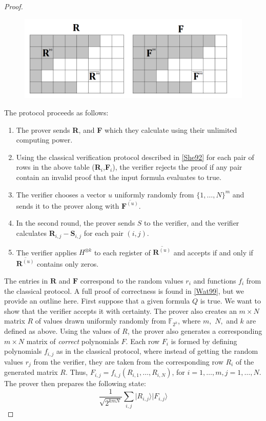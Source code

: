 \documentclass[12pt]{article}
\numberwithin{thm}{section}
\numberwithin{defn}{section}
\numberwithin{prop}{section}
\numberwithin{rmk}{section}
\newcommand{\ket}[1]{\vert #1 \rangle}
\begin{document}
\begin{proof}
	\begin{figure}[h!]
		\centering
		\includegraphics[width=\linewidth]{R grid.png}
	\end{figure}
	\newpage
	The protocol proceeds as follows: 
	\begin{enumerate}
	\item The prover sends \textbf{R}, and \textbf{F} which they calculate using their unlimited computing power. \item Using the classical verification protocol described in \hyperref[she92]{[She92]} for each pair of rows in the above table (\textbf{R}$_i$,\textbf{F}$_i$), the verifier rejects the proof if any pair contain an invalid proof that the input formula evaluates to true.
	\item The verifier chooses a vector $u$ uniformly randomly from $\{1,\dots,N\}^m$ and sends it to the prover along with $\overline{\textbf{F}^{(u)}}$.
	\item In the second round, the prover sends $S$ to the verifier, and the verifier calculates \textbf{R}$_{i,j}-$\textbf{S}$_{i,j}$ for each pair $(i,j)$. 
	
	\item The verifier applies $H^{\otimes k}$ to each register of $\overline{\textbf{R}^{(u)}}$ and accepts if and only if $\overline{\textbf{R}^{(u)}}$ contains only zeros.
	\end{enumerate}
	
	The entries in $\textbf{R}$ and $\textbf{F}$ correspond to the random values $r_i$ and functions $f_i$ from the classical protocol. A full proof of correctness is found in \hyperref[wat99]{[Wat99]}, but we provide an outline here. First suppose that a given formula $Q$ is true. We want to show that the verifier accepts it with certainty. The prover also creates an $m\times N$ matrix $R$ of values drawn uniformly randomly from $\mathbb{F}_{2^k}$, where $m,$ $N,$ and $k$ are defined as above. Using the values of $R$, the prover also generates a corresponding $m\times N$ matrix of \textit{correct} polynomials $F$. Each row $F_i$ is formed by defining polynomials $f_{i,j}$ as in the classical protocol, where instead of getting the random values $r_j$ from the verifier, they are taken from the corresponding row $R_i$ of the generated matrix $R$. Thus, $F_{i,j}=f_{i,j}(R_{i,1},\dots,R_{i,N})$, for $i=1,\dots,m,j=1,\dots,N$. The prover then prepares the following state:
		\[\frac{1}{\sqrt{2^{kmN}}}\sum_{i,j}\ket{R_{i,j}}\ket{F_{i,j}}\]
		

\end{proof}
\end{document}
